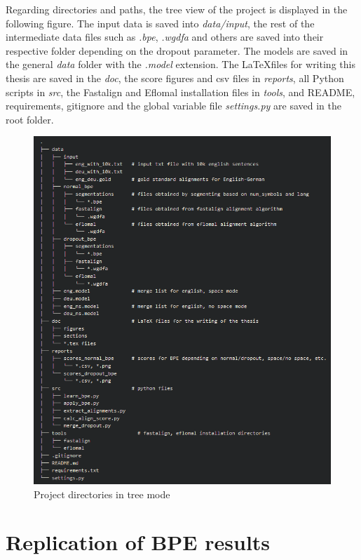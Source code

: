 Regarding directories and paths, the tree view of the project is displayed in the following figure. The input data is saved into \emph{data/input}, the rest of the intermediate data files such as \emph{.bpe}, \emph{.wgdfa} and others are saved into their respective folder depending on the dropout parameter. The models are saved in the general \emph{data} folder with the \emph{.model} extension. The \LaTeX files for writing this thesis are saved in the \emph{doc}, the score figures and csv files in \emph{reports}, all Python scripts in \emph{src}, the Fastalign and Eflomal installation files in \emph{tools}, and README, requirements, gitignore and the global variable file \emph{settings.py} are saved in the root folder.

\begin{figure}[!ht]
    \centering
    \includegraphics[width=16cm]{figures/dir.png}
    \caption{Project directories in tree mode}
\end{figure}

\section{Replication of BPE results}

